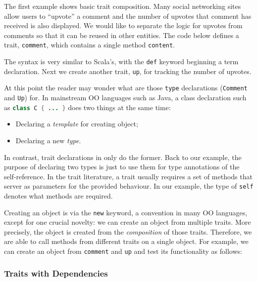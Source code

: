 The first example shows basic trait composition. Many social networking sites
allow users to ``upvote'' a comment and the number of upvotes that comment has
received is also displayed. We would like to separate the logic for upvotes from
comments so that it can be reused in other entities. The code below defines a
trait, \lstinline$comment$, which contains a single method \lstinline$content$.


The syntax is very similar to Scala's, with the \lstinline{def} keyword
beginning a term declaration. Next we create another trait, \lstinline$up$, for
tracking the number of upvotes.


At this point the reader may wonder what are those \lstinline{type} declarations
(\lstinline$Comment$ and \lstinline$Up$) for. In mainstream OO languages such as
Java, a class declaration such as \lstinline[language=java]$class C { ... }$ does two things at
the same time:

\begin{itemize}
\item Declaring a \textit{template} for creating object;
\item Declaring a new \textit{type}.
\end{itemize}

In contrast, trait declarations in \name only do the former. Back to our
example, the purpose of declaring two types is just to use them for type
annotations of the self-reference. In the trait literature, a trait usually
requires a set of methods that server as parameters for the provided behaviour.
In our example, the type of \lstinline$self$ denotes what methods are required.

Creating an object is via the \lstinline{new} keyword, a convention in many OO
languages, except for one crucial novelty: we can create an object from multiple
traits. More precisely, the object is created from the \textit{composition} of
those traits. Therefore, we are able to call methods from different traits on a
single object. For example, we can create an object from \lstinline$comment$ and
\lstinline$up$ and test its functionality as follows:


\subsubsection{Traits with Dependencies}

